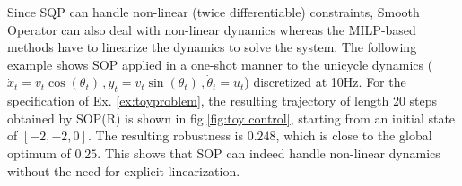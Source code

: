 \begin{exmp}
	\label{ex:nl_unicycle}
Since SQP can handle non-linear (twice differentiable) constraints, Smooth Operator can also deal with non-linear dynamics whereas the MILP-based methods have to linearize the dynamics to solve the system. 
The following example shows SOP applied in a one-shot manner to the unicycle dynamics ($\dot{x}_t=v_t \cos (\theta_t)\, ,\dot{y}_t=v_t \sin (\theta_t)\, ,\dot{\theta}_t= u_t$) discretized at 10Hz.
For the specification of Ex. \ref{ex:toyproblem}, the resulting trajectory of length 20 steps obtained by SOP(R) is shown in fig.\ref{fig:toy control}, starting from an initial state of $[-2,-2,0]$. The resulting robustness is $0.248$, which is close to the global optimum of $0.25$. This shows that SOP can indeed handle non-linear dynamics without the need for explicit linearization.
\end{exmp}